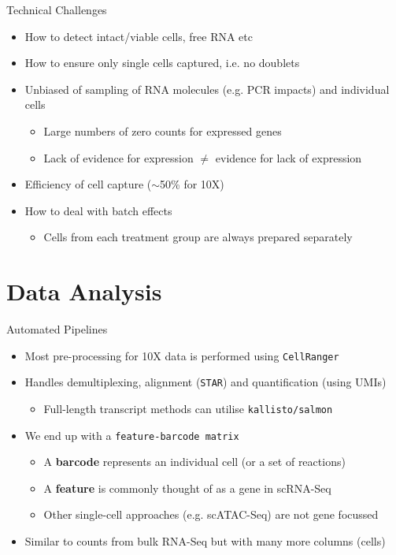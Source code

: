 \documentclass[aspectratio=169,11pt]{beamer}
\begin{document}
\begin{frame}{Technical Challenges}

	\begin{itemize}
		\item How to detect intact/viable cells, free RNA etc
		\item How to ensure only single cells captured, i.e. no doublets
		\item Unbiased of sampling of RNA molecules (e.g. PCR impacts) and individual cells
		\begin{itemize}
			\item Large numbers of zero counts for expressed genes
			\item Lack of evidence for expression $\neq$ evidence for lack of expression
		\end{itemize}
		\item Efficiency of cell capture ($\sim$50\% for 10X)
		\item How to deal with batch effects
		\begin{itemize}
			\item Cells from each treatment group are always prepared separately
		\end{itemize}
	\end{itemize}

\end{frame}

\section{Data Analysis}

\begin{frame}{Automated Pipelines}
	\begin{itemize}
		\item Most pre-processing for 10X data is performed using \texttt{CellRanger}
		\item Handles demultiplexing, alignment (\texttt{STAR}) and quantification (using UMIs)
		\begin{itemize}
			\item Full-length transcript methods can utilise \texttt{kallisto/salmon}
		\end{itemize}
		\item We end up with a \texttt{feature-barcode matrix}
		\begin{itemize}
			\item A \textbf{barcode} represents an individual cell (or a set of reactions)
			\item A \textbf{feature} is commonly thought of as a gene in scRNA-Seq
			\item Other single-cell approaches (e.g. scATAC-Seq) are not gene focussed
		\end{itemize}
		\item Similar to counts from bulk RNA-Seq but with many more columns (cells)
	\end{itemize}
\end{frame}
\end{document}

